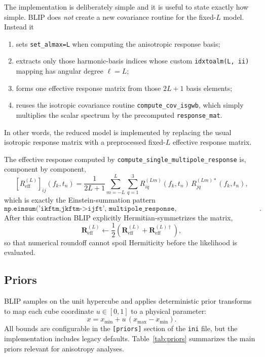 \documentclass[11pt]{article}
\begin{document}
The implementation is deliberately simple and it is useful to state exactly how simple. BLIP does \emph{not} create a new covariance routine for the fixed-$L$ model. Instead it
\begin{enumerate}
\item sets \texttt{set\_almax=L} when computing the anisotropic response basis;
\item extracts only those harmonic-basis indices whose custom \texttt{idxtoalm(L, ii)} mapping has angular degree $\ell=L$;
\item forms one effective response matrix from those $2L+1$ basis elements;
\item reuses the isotropic covariance routine \texttt{compute\_cov\_isgwb}, which simply multiplies the scalar spectrum by the precomputed \texttt{response\_mat}.
\end{enumerate}
In other words, the reduced model is implemented by replacing the usual isotropic response matrix with a preprocessed fixed-$L$ effective response matrix.

The effective response computed by \texttt{compute\_single\_multipole\_response} is, component by component,
\begin{equation}
\left[R_{\mathrm{eff}}^{(L)}\right]_{ij}(f_k,t_n)
=\frac{1}{2L+1}
\sum_{m=-L}^{L}\sum_{q=1}^{3}
R_{iq}^{(Lm)}(f_k,t_n)\,
R_{jq}^{(Lm)\ast}(f_k,t_n),
\end{equation}
which is exactly the Einstein-summation pattern
\begin{equation}
\texttt{np.einsum('ikftm,jkftm->ijft', multipole\_response, conj(multipole\_response))}.
\end{equation}
After this contraction BLIP explicitly Hermitian-symmetrizes the matrix,
\begin{equation}
\mathbf{R}_{\mathrm{eff}}^{(L)}
\leftarrow
\frac{1}{2}\left(
\mathbf{R}_{\mathrm{eff}}^{(L)}
+\mathbf{R}_{\mathrm{eff}}^{(L)\dagger}
\right),
\end{equation}
so that numerical roundoff cannot spoil Hermiticity before the likelihood is evaluated.

\subsection{Priors}
BLIP samples on the unit hypercube and applies deterministic prior transforms to map each cube coordinate $u\in[0,1]$ to a physical parameter:
\begin{equation}
x=x_{\min}+u\,(x_{\max}-x_{\min}).
\end{equation}
All bounds are configurable in the \texttt{[priors]} section of the \texttt{ini} file, but the implementation includes legacy defaults. Table~\ref{tab:priors} summarizes the main priors relevant for anisotropy analyses.
\end{document}
